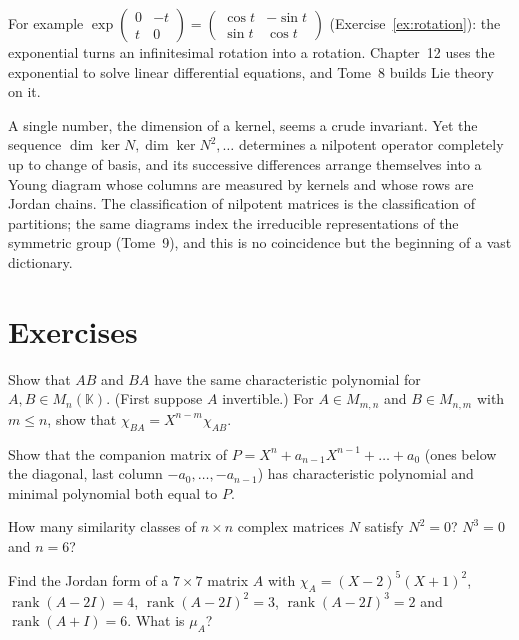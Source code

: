 For example $\exp\begin{pmatrix}0&-t\\t&0\end{pmatrix}=\begin{pmatrix}\cos t&-\sin t\\\sin t&\cos t\end{pmatrix}$
(Exercise~\ref{ex:rotation}): the exponential turns an infinitesimal rotation into a rotation. Chapter~12 uses the
exponential to solve linear differential equations, and Tome~8 builds Lie theory on it.

\begin{beauty}
A single number, the dimension of a kernel, seems a crude invariant. Yet the sequence $\dim\ker N,\dim\ker N^2,\dots$
determines a nilpotent operator completely up to change of basis, and its successive differences arrange themselves into a
Young diagram whose columns are measured by kernels and whose rows are Jordan chains. The classification of nilpotent
matrices is the classification of partitions; the same diagrams index the irreducible representations of the symmetric
group (Tome~9), and this is no coincidence but the beginning of a vast dictionary.
\end{beauty}

\section{Exercises}

\begin{exercise}[$\star$]\label{ex:abba}
Show that $AB$ and $BA$ have the same characteristic polynomial for $A,B\in M_n(\mathbb K)$. (First suppose $A$ invertible.)
For $A\in M_{m,n}$ and $B\in M_{n,m}$ with $m\le n$, show that $\chi_{BA}=X^{n-m}\chi_{AB}$.
\end{exercise}

\begin{exercise}[$\star$]\label{ex:companion}
Show that the companion matrix of $P=X^n+a_{n-1}X^{n-1}+\dots+a_0$ (ones below the diagonal, last column
$-a_0,\dots,-a_{n-1}$) has characteristic polynomial and minimal polynomial both equal to $P$.
\end{exercise}

\begin{exercise}[$\star$]\label{ex:nilcount}
How many similarity classes of $n\times n$ complex matrices $N$ satisfy $N^2=0$? $N^3=0$ and $n=6$?
\end{exercise}

\begin{exercise}[$\star\star$]\label{ex:jordanfind}
Find the Jordan form of a $7\times7$ matrix $A$ with $\chi_A=(X-2)^5(X+1)^2$, $\operatorname{rank}(A-2I)=4$,
$\operatorname{rank}(A-2I)^2=3$, $\operatorname{rank}(A-2I)^3=2$ and $\operatorname{rank}(A+I)=6$. What is $\mu_A$?
\end{exercise}

